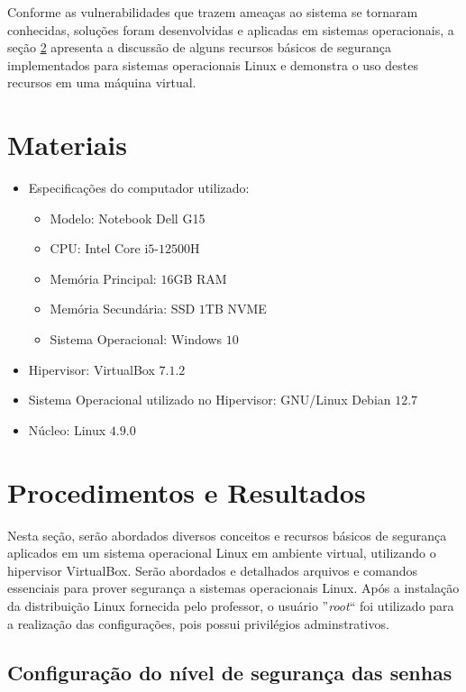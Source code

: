 \documentclass[
	12pt,				%
	oneside,   	        %
	a4paper,			%
	english,			%
	french,				%
	spanish,			%
	brazil,				%
	]{pacotes/abntex2}
\begin{document}
Conforme as vulnerabilidades que trazem ameaças ao sistema se tornaram conhecidas, soluções foram desenvolvidas e aplicadas em sistemas operacionais, a seção \ref{sec:procedimentos} apresenta a discussão de alguns recursos básicos de segurança implementados para sistemas operacionais Linux e demonstra o uso destes recursos em uma máquina virtual.

\section{Materiais}
\label{sec:materiais}

\begin{itemize}
  \item Especificações do computador utilizado:
  \begin{itemize}
    \item Modelo: Notebook Dell G15
    \item CPU: Intel Core i$5$-$12500$H
    \item Memória Principal: $16$GB RAM
    \item Memória Secundária: SSD $1$TB NVME
    \item Sistema Operacional: Windows $10$
  \end{itemize}
  \item Hipervisor: VirtualBox $7.1.2$
  \item Sistema Operacional utilizado no Hipervisor: GNU/Linux Debian $12.7$
  \item Núcleo: Linux $4.9.0$ 
\end{itemize}

\section{Procedimentos e Resultados}
\label{sec:procedimentos}

Nesta seção, serão abordados diversos conceitos e recursos básicos de segurança aplicados em um sistema operacional Linux em ambiente virtual, utilizando o hipervisor VirtualBox. Serão abordados e detalhados arquivos e comandos essenciais para prover segurança a sistemas operacionais Linux. Após a instalação da distribuição Linux fornecida pelo professor, o usuário ''\textit{root}`` foi utilizado para a realização das configurações, pois possui privilégios adminstrativos.

\subsection{Configuração do nível de segurança das senhas}
\label{subsec:senhas}
\end{document}
